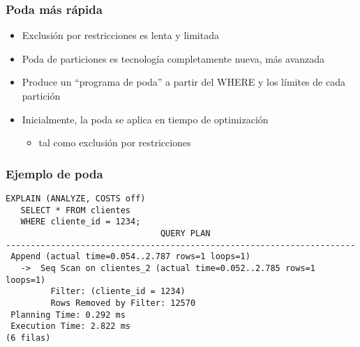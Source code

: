 \begin{frame}
  \frametitle{Poda más rápida}

  \begin{itemize}
    \item Exclusión por restricciones es lenta y limitada
    \item Poda de particiones es tecnología completamente nueva, más avanzada
    \item Produce un ``programa de poda'' a partir del WHERE y los límites de cada partición
    \item Inicialmente, la poda se aplica en tiempo de optimización
      \begin{itemize}
	\item tal como exclusión por restricciones
      \end{itemize}
  \end{itemize}
\end{frame}

\begin{frame}[fragile]
  \frametitle{Ejemplo de poda}
\footnotesize
\begin{lstlisting}
EXPLAIN (ANALYZE, COSTS off)
   SELECT * FROM clientes
   WHERE cliente_id = 1234;
                               QUERY PLAN                               
----------------------------------------------------------------------
 Append (actual time=0.054..2.787 rows=1 loops=1)
   ->  Seq Scan on clientes_2 (actual time=0.052..2.785 rows=1 loops=1)
         Filter: (cliente_id = 1234)
         Rows Removed by Filter: 12570
 Planning Time: 0.292 ms
 Execution Time: 2.822 ms
(6 filas)
\end{lstlisting}
\end{frame}

